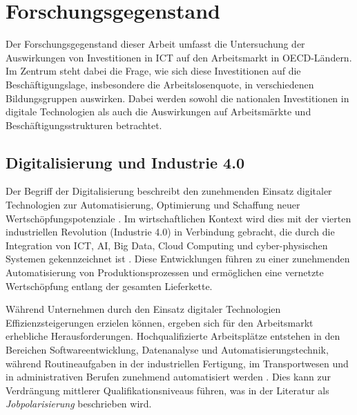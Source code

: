 

\section{Forschungsgegenstand}

Der Forschungsgegenstand dieser Arbeit umfasst die Untersuchung der Auswirkungen von 
Investitionen in \ac{ICT} auf den Arbeitsmarkt in \ac{OECD}-Ländern. Im Zentrum steht 
dabei die Frage, wie sich diese Investitionen auf die Beschäftigungslage, insbesondere 
die Arbeitslosenquote, in verschiedenen Bildungsgruppen auswirken. Dabei werden sowohl 
die nationalen Investitionen in digitale Technologien als auch die Auswirkungen auf 
Arbeitsmärkte und Beschäftigungsstrukturen betrachtet.



\subsection{Digitalisierung und Industrie 4.0}

Der Begriff der Digitalisierung beschreibt den zunehmenden Einsatz digitaler Technologien
zur Automatisierung, Optimierung und Schaffung neuer Wertschöpfungspotenziale
\parencite[vgl.][S. 6]{brennen2016theinternational}. Im wirtschaftlichen Kontext wird 
dies mit der vierten industriellen Revolution (Industrie 4.0) in Verbindung gebracht, die 
durch die Integration von \ac{ICT}, \ac{AI}, Big Data, Cloud Computing und 
cyber-physischen Systemen gekennzeichnet ist 
\parencite[vgl.][S. 22]{kagermann2013recommendations}. Diese Entwicklungen führen zu einer 
zunehmenden Automatisierung von Produktionsprozessen und ermöglichen eine vernetzte 
Wertschöpfung entlang der gesamten Lieferkette.

Während Unternehmen durch den Einsatz digitaler Technologien Effizienzsteigerungen 
erzielen können, ergeben sich für den Arbeitsmarkt erhebliche Herausforderungen. 
Hochqualifizierte Arbeitsplätze entstehen in den Bereichen Softwareentwicklung, 
Datenanalyse und Automatisierungstechnik, während Routineaufgaben in der industriellen 
Fertigung, im Transportwesen und in administrativen Berufen zunehmend automatisiert 
werden \parencite[vgl.][S. 40]{frey2013thefuture}. Dies kann zur Verdrängung mittlerer
Qualifikationsniveaus führen, was in der Literatur als \textit{Jobpolarisierung} 
beschrieben wird.

